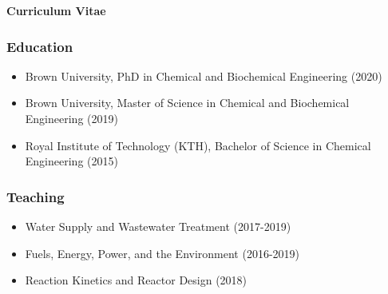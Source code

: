 \begin{center}
\textbf{Curriculum Vitae}
\end{center}

\subsubsection*{\textbf{Education}}
\begin{itemize}
  \item Brown University, PhD in Chemical and Biochemical Engineering (2020)
  \item Brown University, Master of Science in Chemical and Biochemical Engineering (2019)
  \item Royal Institute of Technology (KTH), Bachelor of Science in Chemical Engineering (2015)
\end{itemize}

\subsubsection*{\textbf{Teaching}}
\begin{itemize}
  \item Water Supply and Wastewater Treatment (2017-2019)
  \item Fuels, Energy, Power, and the Environment (2016-2019)
  \item Reaction Kinetics and Reactor Design (2018)
\end{itemize}

